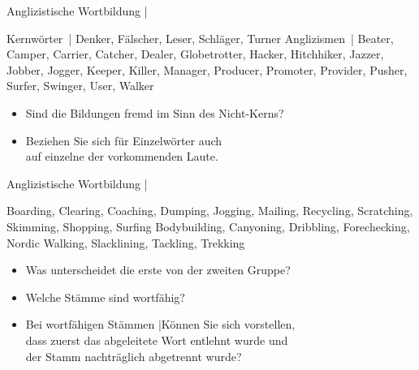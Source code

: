 \begin{frame}
  {Anglizistische Wortbildung | }
  \onslide<+->
  \onslide<+->
  \begin{exe}
    \ex \alert{Kernwörter} | Denker, Fälscher, Leser, Schläger, Turner
    \onslide<+->
    \Zeile
    \ex \alert{Anglizismen} | Beater, Camper, Carrier, Catcher, Dealer, Globetrotter, Hacker, Hitchhiker, Jazzer, Jobber, Jogger, Keeper, Killer, Manager, Producer, Promoter, Provider, Pusher, Surfer, Swinger, User, Walker
  \end{exe}
  \onslide<+->
  \Zeile
  \begin{itemize}[<+->]
    \item Sind die Bildungen \alert{fremd} im Sinn des Nicht-Kerns?
    \item Beziehen Sie sich für Einzelwörter auch\\
      auf einzelne der vorkommenden Laute.
  \end{itemize}
\end{frame}

\begin{frame}
  {Anglizistische Wortbildung | }
  \onslide<+->
  \onslide<+->
  \begin{exe}
    \ex Boarding, Clearing, Coaching, Dumping, Jogging, Mailing, Recycling,
Scratching, Skimming, Shopping, Surfing
    \onslide<+->
    \Halbzeile
    \ex Bodybuilding, Canyoning, Dribbling, Forechecking, Nordic Walking, Slacklining, Tackling, Trekking
  \end{exe}
  \onslide<+->
  \Zeile
  \begin{itemize}[<+->]
    \item Was unterscheidet die erste von der zweiten Gruppe?
    \item Welche Stämme sind \alert{wortfähig}?
    \item Bei wortfähigen Stämmen  |Können Sie sich vorstellen,\\
      dass \alert{zuerst das abgeleitete Wort entlehnt wurde} und\\
      der Stamm nachträglich abgetrennt wurde?
  \end{itemize}
\end{frame}

